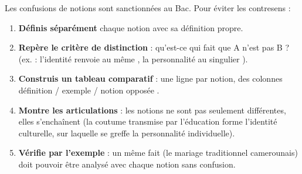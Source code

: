 \documentclass[11pt]{article}
\begin{document}
\begin{methode}
Les confusions de notions sont sanctionnées au Bac. Pour éviter les contresens :
\begin{enumerate}
\item \textbf{Définis séparément} chaque notion avec sa définition propre.
\item \textbf{Repère le critère de distinction} : qu'est-ce qui fait que A n'est pas B ? (ex. : l'identité renvoie au \guillemotleft même \guillemotright, la personnalité au \guillemotleft singulier \guillemotright).
\item \textbf{Construis un tableau comparatif} : une ligne par notion, des colonnes \guillemotleft définition / exemple / notion opposée \guillemotright.
\item \textbf{Montre les articulations} : les notions ne sont pas seulement différentes, elles s'enchaînent (la coutume transmise par l'éducation forme l'identité culturelle, sur laquelle se greffe la personnalité individuelle).
\item \textbf{Vérifie par l'exemple} : un même fait (le mariage traditionnel camerounais) doit pouvoir être analysé avec chaque notion sans confusion.
\end{enumerate}
\end{methode}
\end{document}
